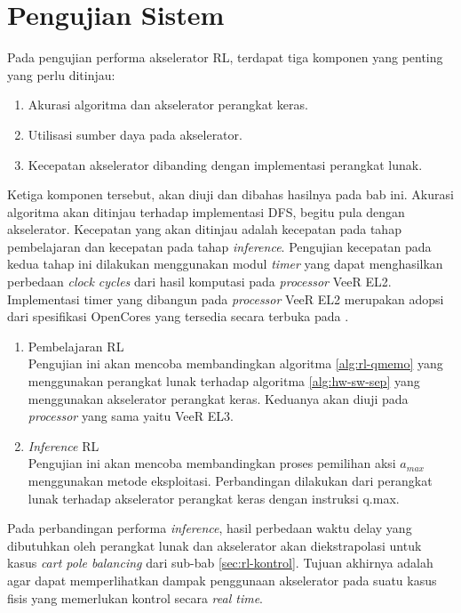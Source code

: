 \chapter{Pengujian Sistem}

Pada pengujian performa akselerator \ac{RL}, terdapat tiga komponen yang penting yang perlu ditinjau:

\begin{enumerate}
	\item Akurasi algoritma dan akselerator perangkat keras.
	\item Utilisasi sumber daya pada akselerator.
	\item Kecepatan akselerator dibanding dengan implementasi perangkat lunak.
\end{enumerate}

Ketiga komponen tersebut, akan diuji dan dibahas hasilnya pada bab ini. Akurasi algoritma akan ditinjau terhadap implementasi \ac{DFS}, begitu pula dengan akselerator. Kecepatan yang akan ditinjau adalah kecepatan pada tahap pembelajaran dan kecepatan pada tahap \textit{inference}. Pengujian kecepatan pada kedua tahap ini dilakukan menggunakan modul \textit{timer} yang dapat menghasilkan perbedaan \textit{clock cycles} dari hasil komputasi pada \textit{processor} VeeR EL2. Implementasi timer yang dibangun pada \textit{processor} VeeR EL2 merupakan adopsi dari spesifikasi OpenCores yang tersedia secara terbuka pada \parencite{open2024ptc}.

\begin{enumerate}
	\item Pembelajaran \acl{RL}\\
	      Pengujian ini akan mencoba membandingkan algoritma \ref{alg:rl-qmemo} yang menggunakan perangkat lunak terhadap algoritma \ref{alg:hw-sw-sep} yang menggunakan akselerator perangkat keras. Keduanya akan diuji pada \textit{processor} yang sama yaitu VeeR EL3.
	\item \textit{Inference} \acl{RL}\\
	      Pengujian ini akan mencoba membandingkan proses pemilihan aksi $a_{max}$ menggunakan metode eksploitasi. Perbandingan dilakukan dari perangkat lunak terhadap akselerator perangkat keras dengan instruksi q.max.
\end{enumerate}

Pada perbandingan performa \textit{inference}, hasil perbedaan waktu delay yang dibutuhkan oleh perangkat lunak dan akselerator akan diekstrapolasi untuk kasus \textit{cart pole balancing} dari sub-bab \ref{sec:rl-kontrol}. Tujuan akhirnya adalah agar dapat memperlihatkan dampak penggunaan akselerator pada suatu kasus fisis yang memerlukan kontrol secara \textit{real time}.


